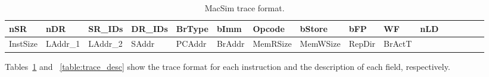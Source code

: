 \ignore
		{
		\begin{table}[htb]
		\begin{footnotesize}
		\begin{center}
		\caption{MacSim trace format.}
		\label{table:trace_format}
		\begin{tabular}{|l|l|l|l|l|l|l|l|l|l|l|l|l|l|l|l|} 
		\hline
		nSR & nDR & SR\_IDs & DR\_IDs & BrType & bImm & Opcode & bStore & bFP & WF & nLD  \\ \hline \hline
		InstSize & LAddr\_1 & LAddr\_2 & SAddr & PCAddr & BrAddr & MemRSize & MemWSize & RepDir & BrActT & \\ \hline
		\end{tabular}
		\end{center}
		\end{footnotesize}
		\end{table}

		Tables~\ref{table:trace_format} and ~\ref{table:trace_desc} show the trace
		format for each instruction and the description of each field, respectively.
		}

 